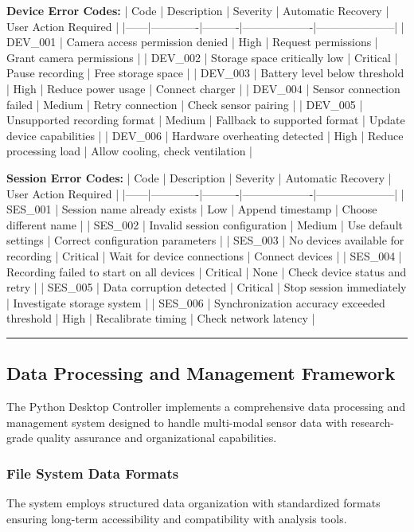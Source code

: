 \documentclass[11pt,a4paper]{article}
\begin{document}
\textbf{Device Error Codes:}
| Code | Description | Severity | Automatic Recovery | User Action Required |
|------|-------------|----------|-------------------|---------------------|
| DEV\_001 | Camera access permission denied | High | Request permissions | Grant camera permissions |
| DEV\_002 | Storage space critically low | Critical | Pause recording | Free storage space |
| DEV\_003 | Battery level below threshold | High | Reduce power usage | Connect charger |
| DEV\_004 | Sensor connection failed | Medium | Retry connection | Check sensor pairing |
| DEV\_005 | Unsupported recording format | Medium | Fallback to supported format | Update device capabilities |
| DEV\_006 | Hardware overheating detected | High | Reduce processing load | Allow cooling, check ventilation |

\textbf{Session Error Codes:}
| Code | Description | Severity | Automatic Recovery | User Action Required |
|------|-------------|----------|-------------------|---------------------|
| SES\_001 | Session name already exists | Low | Append timestamp | Choose different name |
| SES\_002 | Invalid session configuration | Medium | Use default settings | Correct configuration parameters |
| SES\_003 | No devices available for recording | Critical | Wait for device connections | Connect devices |
| SES\_004 | Recording failed to start on all devices | Critical | None | Check device status and retry |
| SES\_005 | Data corruption detected | Critical | Stop session immediately | Investigate storage system |
| SES\_006 | Synchronization accuracy exceeded threshold | High | Recalibrate timing | Check network latency |

\hrule

\subsection{Data Processing and Management Framework}

The Python Desktop Controller implements a comprehensive data processing and management system designed to handle
multi-modal sensor data with research-grade quality assurance and organizational capabilities.

\subsubsection{File System Data Formats}

The system employs structured data organization with standardized formats ensuring long-term accessibility and
compatibility with analysis tools.
\end{document}
